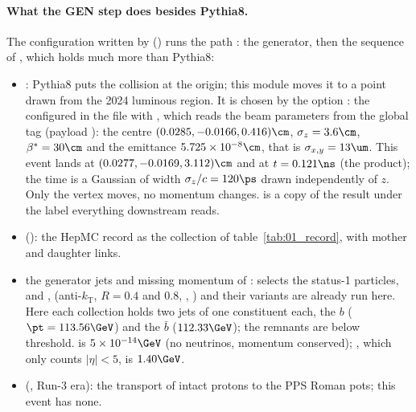 \paragraph{What the GEN step does besides Pythia8.} The configuration written by 
() runs the path : the generator, then the
sequence  of , which holds much
more than Pythia8:
\begin{itemize}
\item {}: Pythia8 puts the collision at the origin; this module moves it to a point drawn
  from the 2024 luminous region. It is chosen by the option : the
   configured in the file
   with , which
  reads the beam parameters from the global tag  (payload
  ):
  the centre $(0.0285, -0.0166, 0.416)\cm$, $\sigma_z = 3.6\cm$, $\beta^* = 30\cm$ and the emittance
  $5.725\times10^{-8}\cm$, that is $\sigma_{x,y} = 13\um$. This event lands at
  $(0.0277, -0.0169, 3.112)\cm$ and at $t = 0.121\ns$ (the  product); the time is a
  Gaussian of width $\sigma_z/c = 120\ps$ drawn independently of $z$. Only the vertex moves, no momentum
  changes.  is a copy of the result under the label everything downstream reads.
\item {} (): the HepMC record as the 
  collection of table~\ref{tab:01_record}, with mother and daughter links.
\item the generator jets and missing momentum of :  selects the
  status-1 particles, and ,  (anti-$k_{\mathrm T}$, $R = 0.4$ and $0.8$,
  , ) and their 
  variants are already run here. Here each collection holds two jets of one constituent each, the $b$ ($\pt = 113.56\GeV$) and the
  $\bar b$ ($112.33\GeV$); the remnants are below threshold.  is $5\times10^{-14}\GeV$
  (no neutrinos, momentum conserved); , which only counts $|\eta| < 5$, is $1.40\GeV$.
\item {} (, Run-3 era): the transport of intact protons to
  the PPS Roman pots; this event has none.
\end{itemize}

